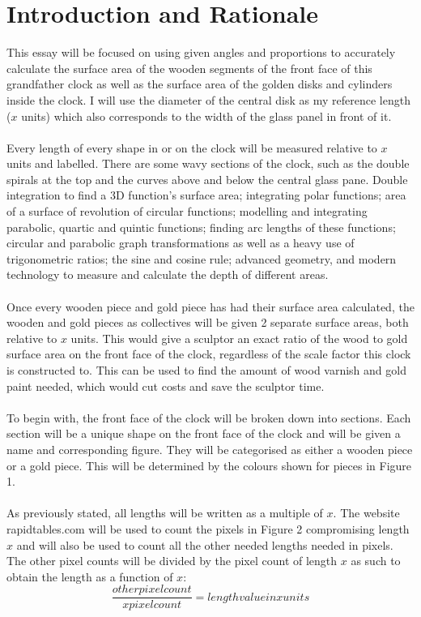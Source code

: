 \documentclass[a4paper,12pt]{article}
\begin{document}
\section{Introduction and Rationale}
This essay will be focused on using given angles and proportions to accurately calculate the surface area of the wooden segments of the front face of this grandfather clock as well as the surface area of the golden disks and cylinders inside the clock. I will use the diameter of the central disk as my reference length ($x$ units) which also corresponds to the width of the glass panel in front of it.\\\\ Every length of every shape in or on the clock will be measured relative to $x$ units and labelled. There are some wavy sections of the clock, such as the double spirals at the top and the curves above and below the central glass pane. Double integration to find a 3D function's surface area; integrating polar functions; area of a surface of revolution of circular functions; modelling and integrating parabolic, quartic and quintic functions; finding arc lengths of these functions; circular and parabolic graph transformations as well as a heavy use of trigonometric ratios; the sine and cosine rule; advanced geometry, and modern technology to measure and calculate the depth of different areas.\\\\Once every wooden piece and gold piece has had their surface area calculated, the wooden and gold pieces as collectives will be given 2 separate surface areas, both relative to $x$ units. This would give a sculptor an exact ratio of the wood to gold surface area on the front face of the clock, regardless of the scale factor this clock is constructed to. This can be used to find the amount of wood varnish and gold paint needed, which would cut costs and save the sculptor time.\\\\To begin with, the front face of the clock will be broken down into sections. Each section will be a unique shape on the front face of the clock and will be given a name and corresponding figure. They will be categorised as either a wooden piece or a gold piece. This will be determined by the colours shown for pieces in Figure 1.\\\\
As previously stated, all lengths will be written as a multiple of $x$. The website rapidtables.com will be used to count the pixels in Figure 2 compromising length $x$ and will also be used to count all the other needed lengths needed in pixels. The other pixel counts will be divided by the pixel count of length $x$ as such to obtain the length as a function of $x$: $$\frac{other pixel count}{x pixel count} = length value in x units$$ 
\end{document}
